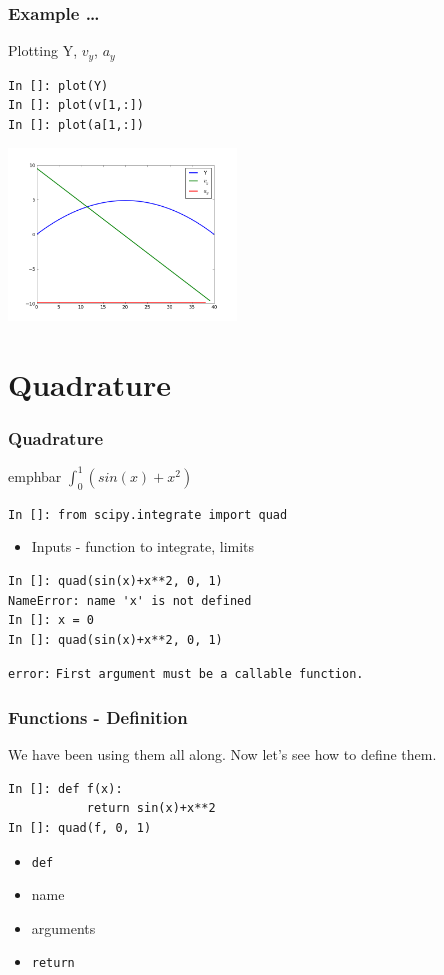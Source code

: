 \documentclass[14pt,compress]{beamer}
\newcommand{\emphbar}[1]
{\begin{beamercolorbox}[rounded=true]{emphbar} 
      {#1}
 \end{beamercolorbox}
}
\newcommand{\typ}[1]{\lstinline{#1}}
\begin{document}
\begin{frame}[fragile]
\frametitle{Example \ldots}
Plotting Y, $v_y$, $a_y$
\begin{lstlisting}
In []: plot(Y)
In []: plot(v[1,:])
In []: plot(a[1,:])
\end{lstlisting}
\begin{center}
  \includegraphics[height=1.8in, interpolate=true]{data/pos_vel_accel}  
\end{center}
\end{frame}

\section{Quadrature}

\begin{frame}[fragile]
\frametitle{Quadrature}

\emphbar{$\int_0^1(sin(x) + x^2)$}

\typ{In []: from scipy.integrate import quad}

\begin{itemize}
\item Inputs - function to integrate, limits
\end{itemize}
\begin{lstlisting}
In []: quad(sin(x)+x**2, 0, 1)
NameError: name 'x' is not defined
In []: x = 0
In []: quad(sin(x)+x**2, 0, 1)
\end{lstlisting}
\begin{small}
\alert{\typ{error:}}
\typ{First argument must be a callable function.}
\end{small}
\end{frame}

\begin{frame}[fragile]
\frametitle{Functions - Definition}
We have been using them all along. Now let's see how to define them.
\begin{lstlisting}
In []: def f(x):
           return sin(x)+x**2
In []: quad(f, 0, 1)
\end{lstlisting}
\begin{itemize}
\item \typ{def}
\item name
\item arguments
\item \typ{return}
\end{itemize}
\end{frame}
\end{document}
